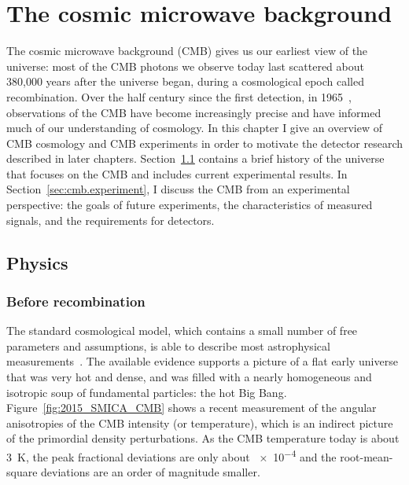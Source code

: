 \chapter{The cosmic microwave background}
\label{chp:cmb}

The cosmic microwave background (CMB) gives us our earliest view of the universe: most of the CMB photons we observe today last scattered about 380,000 years after the universe began, during a cosmological epoch called recombination.
Over the half century since the first detection, in 1965~\autocite{Penzias1965ApJ}, 
observations of the CMB have become increasingly precise and have informed much of our understanding of cosmology.
In this chapter I give an overview of CMB cosmology and CMB experiments in order to motivate the detector research described in later chapters.
Section~\ref{sec:cmb.physics} contains a brief history of the universe that focuses on the CMB and includes current experimental results.
In Section~\ref{sec:cmb.experiment}, I discuss the CMB from an experimental perspective: the goals of future experiments, the characteristics of measured signals, and the requirements for detectors.


\section{Physics}
\label{sec:cmb.physics}

\subsection{Before recombination}
\label{sec:cmb.physics.before}

The standard cosmological model, which contains a small number of free parameters and assumptions, is able to describe most astrophysical measurements~\autocite{Dodelson2003, Bartelmann2010RMP, Spergel2015Science}.
The available evidence supports a picture of a flat early universe that was very hot and dense, and was filled with a nearly homogeneous and isotropic soup of fundamental particles: the hot Big Bang.
Figure~\ref{fig:2015_SMICA_CMB} shows a recent measurement of the angular anisotropies of the CMB intensity (or temperature), which is an indirect picture of the primordial density perturbations.
As the CMB temperature today is about \SI{3}{K}, the peak fractional deviations are only about \num{e-4} and the root-mean-square deviations are an order of magnitude smaller.

